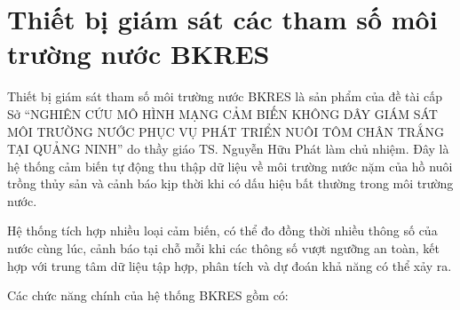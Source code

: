 \section{Thiết bị giám sát các tham số môi trường nước BKRES}
Thiết bị giám sát tham số môi trường nước BKRES là sản phẩm của đề tài cấp Sở “NGHIÊN CỨU MÔ HÌNH MẠNG CẢM BIẾN KHÔNG DÂY GIÁM SÁT MÔI TRƯỜNG NƯỚC PHỤC VỤ PHÁT TRIỂN NUÔI TÔM CHÂN TRẮNG TẠI QUẢNG NINH” do thầy giáo TS. Nguyễn Hữu Phát làm chủ nhiệm. Đây là hệ thống cảm biến tự động thu thập dữ liệu về môi trường nước nặm của hồ nuôi trồng thủy sản và cảnh báo kịp thời khi có dấu hiệu bất thường trong môi trường nước.
\par 
Hệ thống tích hợp nhiều loại cảm biến, có thể đo đồng thời nhiều thông số của nước cùng lúc, cảnh báo tại chỗ mỗi khi các thông số vượt ngưỡng an toàn, kết hợp với trung tâm dữ liệu tập hợp, phân tích và dự đoán khả năng có thể xảy ra.
\par 
Các chức năng chính của hệ thống BKRES gồm có:
